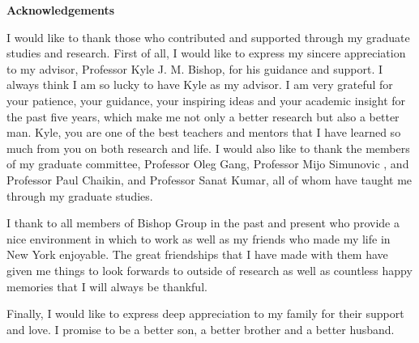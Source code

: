 
\clearpage
\begin{center}

\vspace*{5\baselineskip}
\textbf{\large Acknowledgements}
\end{center}

\hspace{10mm}I would like to thank those who contributed and supported through my graduate studies and research. First of all, I would like to express my sincere appreciation to
my advisor, Professor Kyle J. M. Bishop, for his guidance and support. I always think I am so lucky to have Kyle as my advisor. I am very grateful for your  patience, your guidance, your inspiring ideas and your academic insight  for the past five years, which make me not only a better research but also a better man. Kyle, you are one of the best teachers and mentors that I have learned so much from you on both research and life. I would also like to thank the members of my graduate
committee, Professor Oleg Gang, Professor Mijo Simunovic , and Professor Paul Chaikin, and Professor Sanat Kumar, all of whom have taught me through my graduate studies.

I thank to  all members of Bishop Group in the past and present who provide a nice environment in which to work as well as my friends who made my life in New York enjoyable. The
great friendships that I have made with them have given me things to look forwards to outside of
research as well as countless happy memories that I will always be thankful. 

Finally, I would like to express deep appreciation to my family for their support and love. I promise to be a better son, a better brother and a better husband. 
\clearpage



